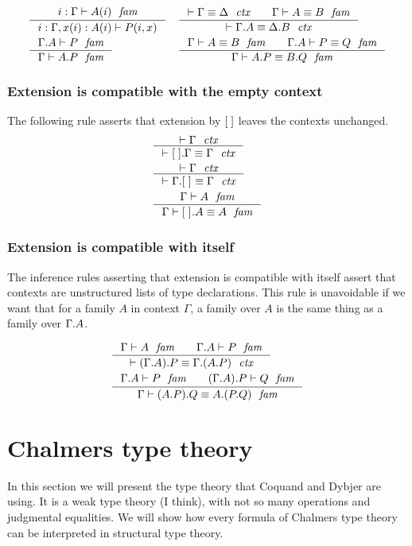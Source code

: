 \begin{align}
& \inference{\jvfam{i}{\Gamma}{A}}{\jvfamcombi{{i}{x}}{{\Gamma}{A}}{P}}
& & \inference{\jctxeq{\Gamma}{\Delta}\qquad\jfameq{\Gamma}{A}{B}}{\jctxeq{\ctxext{\Gamma}{A}}{\ctxext{\Delta}{B}}}\\
& \inference{\jfam{{\Gamma}{A}}{P}}{\jfam{\Gamma}{\ctxext{A}{P}}}
& & \inference{\jfameq{\Gamma}{A}{B}\qquad\jfameq{{\Gamma}{A}}{P}{Q}}{\jfameq{\Gamma}{\ctxext{A}{P}}{\ctxext{B}{Q}}}
\end{align}

\subsubsection{Extension is compatible with the empty context}
The following rule asserts that extension by ${[\;]}$ leaves the contexts unchanged.
\begin{align}
& \inference{\jctx{\Gamma}}{\jctxeq{\ctxext{\emptyc}{\Gamma}}{\Gamma}}\\
& \inference{\jctx{\Gamma}}{\jctxeq{\ctxext{\Gamma}{\emptyf}}{\Gamma}}\\
& \inference{\jfam{\Gamma}{A}}{\jfameq{\Gamma}{\ctxext{\emptyf}{A}}{A}}
\end{align}

\subsubsection{Extension is compatible with itself}\label{comp-ee}
The inference rules asserting that extension is compatible with itself assert
that contexts are unstructured lists of type declarations. This rule is
unavoidable if we want that for a family $A$ in context $\Gamma$, a family over
$A$ is the same thing as a family over $\ctxext{\Gamma}{A}$. 

\begin{align}
& \inference{\jfam{\Gamma}{A}\qquad\jfam{{\Gamma}{A}}{P}}
  {\jctxeq{\ctxext{{\Gamma}{A}}{P}}{\ctxext{\Gamma}{{A}{P}}}}\\
& \inference{\jfam{{\Gamma}{A}}{P}\qquad\jfam{{{\Gamma}{A}}{P}}{Q}}
  {\jfameq{\Gamma}{\ctxext{{A}{P}}{Q}}{\ctxext{A}{{P}{Q}}}}
\end{align}


\section{Chalmers type theory}
In this section we will present the type theory that Coquand and Dybjer are using.
It is a weak type theory (I think), with not so many operations and judgmental equalities.
We will show how every formula of Chalmers type theory can be interpreted in
structural type theory.
